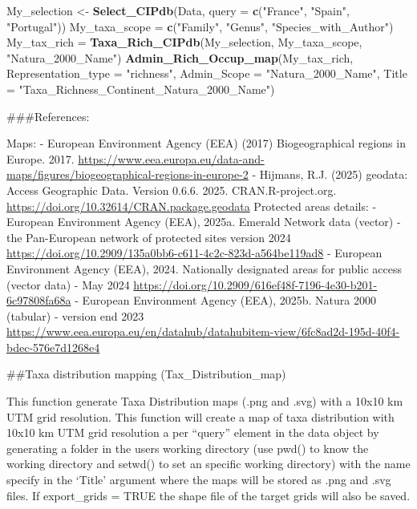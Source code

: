 \documentclass[
]{article}
\newenvironment{Shaded}{\begin{snugshade}}{\end{snugshade}}
\newcommand{\AttributeTok}[1]{\textcolor[rgb]{0.13,0.29,0.53}{#1}}
\newcommand{\FunctionTok}[1]{\textcolor[rgb]{0.13,0.29,0.53}{\textbf{#1}}}
\newcommand{\NormalTok}[1]{#1}
\newcommand{\OtherTok}[1]{\textcolor[rgb]{0.56,0.35,0.01}{#1}}
\newcommand{\StringTok}[1]{\textcolor[rgb]{0.31,0.60,0.02}{#1}}
\begin{document}
\begin{Shaded}
\begin{Highlighting}[]
\NormalTok{My\_selection }\OtherTok{\textless{}{-}} \FunctionTok{Select\_CIPdb}\NormalTok{(Data, }\AttributeTok{query =} \FunctionTok{c}\NormalTok{(}\StringTok{"France"}\NormalTok{, }\StringTok{"Spain"}\NormalTok{, }\StringTok{"Portugal"}\NormalTok{))}
\NormalTok{My\_taxa\_scope }\OtherTok{=} \FunctionTok{c}\NormalTok{(}\StringTok{"Family"}\NormalTok{, }\StringTok{"Genus"}\NormalTok{, }\StringTok{"Species\_with\_Author"}\NormalTok{)}
\NormalTok{My\_tax\_rich }\OtherTok{=} \FunctionTok{Taxa\_Rich\_CIPdb}\NormalTok{(My\_selection, My\_taxa\_scope, }\StringTok{"Natura\_2000\_Name"}\NormalTok{)}
\FunctionTok{Admin\_Rich\_Occup\_map}\NormalTok{(My\_tax\_rich, }\AttributeTok{Representation\_type =} \StringTok{"richness"}\NormalTok{, }\AttributeTok{Admin\_Scope =} \StringTok{"Natura\_2000\_Name"}\NormalTok{, }\AttributeTok{Title =} \StringTok{"Taxa\_Richness\_Continent\_Natura\_2000\_Name"}\NormalTok{)}
\end{Highlighting}
\end{Shaded}

\#\#\#References:

Maps: - European Environment Agency (EEA) (2017) Biogeographical regions
in Europe. 2017.
\url{https://www.eea.europa.eu/data-and-maps/figures/biogeographical-regions-in-europe-2}
- Hijmans, R.J. (2025) geodata: Access Geographic Data. Version 0.6.6.
2025. CRAN.R-project.org.
\url{https://doi.org/10.32614/CRAN.package.geodata} Protected areas
details: - European Environment Agency (EEA), 2025a. Emerald Network
data (vector) - the Pan-European network of protected sites version 2024
\url{https://doi.org/10.2909/135a0bb6-c611-4c2c-823d-a564be119ad8} -
European Environment Agency (EEA), 2024. Nationally designated areas for
public access (vector data) - May 2024
\url{https://doi.org/10.2909/616ef48f-7196-4e30-b201-6c97808fa68a} -
European Environment Agency (EEA), 2025b. Natura 2000 (tabular) -
version end 2023
\url{https://www.eea.europa.eu/en/datahub/datahubitem-view/6fc8ad2d-195d-40f4-bdec-576e7d1268e4}

\#\#Taxa distribution mapping (Tax\_Distribution\_map)

This function generate Taxa Distribution maps (.png and .svg) with a
10x10 km UTM grid resolution. This function will create a map of taxa
distribution with 10x10 km UTM grid resolution a per ``query'' element
in the data object by generating a folder in the users working directory
(use pwd() to know the working directory and setwd() to set an specific
working directory) with the name specify in the `Title' argument where
the maps will be stored as .png and .svg files. If export\_grids = TRUE
the shape file of the target grids will also be saved.
\end{document}
